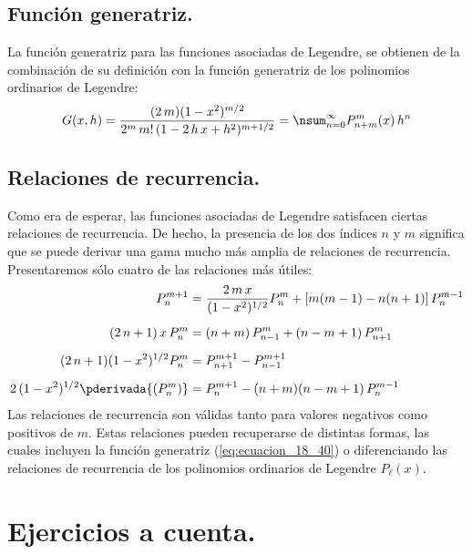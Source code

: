 \subsection{Función generatriz.}

La función generatriz para las funciones asociadas de Legendre, se obtienen de la combinación de su definición con la función generatriz de los polinomios ordinarios de Legendre:
\begin{align}
G(x, h) = \dfrac{(2 \, m)(1 - x^{2})^{m/2}}{2^{m} \, m! \, (1 - 2 \, h \, x + h^{2})^{m+1/2}} = \nsum_{n=0}^{\infty} P_{n+m}^{m} (x) \, h^{n}
\label{eq:ecuacion_18_40}
\end{align}

\subsection{Relaciones de recurrencia.}

Como era de esperar, las funciones asociadas de Legendre satisfacen ciertas relaciones de recurrencia. De hecho, la presencia de los dos índices $n$ y $m$ significa que se puede derivar una gama mucho más amplia de relaciones de recurrencia. Presentaremos sólo cuatro de las relaciones más útiles:
\begin{align*}
P_{n}^{m+1} &= \dfrac{2 \, m \, x}{(1 - x^{2})^{1/2}} P_{n}^{m} + [m (m - 1) - n (n + 1)] \, P_{n}^{m-1} \\[0.5em]
(2 \, n + 1) \, x \, P_{n}^{m} &= (n + m) \, P_{n-1}^{m} + (n - m + 1) \, P_{n+1}^{m} \\[0.5em]
(2 \, n + 1)(1 -  x^{2})^{1/2} P_{n}^{m} &= P_{n+1}^{m+1} - P_{n-1}^{m+1} \\[0.5em]
2 \, (1 - x^{2})^{1/2} \pderivada{(P_{n}^{m})} &= P_{n}^{m+1} - (n + m)(n - m + 1) \, P_{n}^{m-1}
\end{align*}
Las relaciones de recurrencia son válidas tanto para valores negativos como positivos de $m$. Estas relaciones pueden recuperarse de distintas formas, las cuales incluyen la función generatriz (\ref{eq:ecuacion_18_40}) o diferenciando las relaciones de recurrencia de los polinomios ordinarios de Legendre $P_{\ell}(x)$.

\section{Ejercicios a cuenta.}

\noindent

